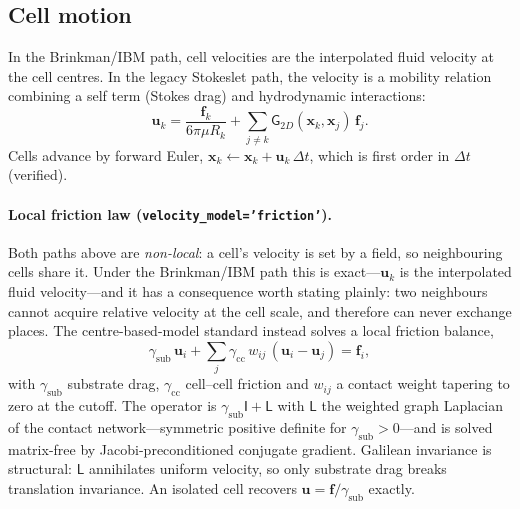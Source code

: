 \documentclass[11pt]{article}
\newcommand{\vu}{\bm{u}}
\newcommand{\vf}{\bm{f}}
\newcommand{\vx}{\bm{x}}
\newcommand{\dt}{\Delta t}
\begin{document}
\subsection{Cell motion}\label{sec:motion}
In the Brinkman/IBM path, cell velocities are the interpolated fluid velocity at
the cell centres. In the legacy Stokeslet path, the velocity is a mobility
relation combining a self term (Stokes drag) and hydrodynamic interactions:
\begin{equation}
  \vu_k = \frac{\vf_k}{6\pi\mu R_k}
  + \sum_{j\neq k} \mathsf{G}_{2D}(\vx_k,\vx_j)\,\vf_j .
\end{equation}
Cells advance by forward Euler, $\vx_k \leftarrow \vx_k + \vu_k\,\dt$, which is
first order in $\dt$ (verified).

\paragraph{Local friction law (\texttt{velocity\_model='friction'}).} Both paths
above are \emph{non-local}: a cell's velocity is set by a field, so neighbouring
cells share it. Under the Brinkman/IBM path this is exact---$\vu_k$ is the
interpolated fluid velocity---and it has a consequence worth stating plainly:
two neighbours cannot acquire relative velocity at the cell scale, and therefore
can never exchange places. The centre-based-model standard instead solves a local
friction balance,
\begin{equation}
  \gamma_{\text{sub}}\,\vu_i
  + \sum_j \gamma_{\text{cc}}\,w_{ij}\,(\vu_i-\vu_j) = \vf_i ,
\end{equation}
with $\gamma_{\text{sub}}$ substrate drag, $\gamma_{\text{cc}}$ cell--cell
friction and $w_{ij}$ a contact weight tapering to zero at the cutoff. The
operator is $\gamma_{\text{sub}}\mathsf{I}+\mathsf{L}$ with $\mathsf{L}$ the
weighted graph Laplacian of the contact network---symmetric positive definite for
$\gamma_{\text{sub}}>0$---and is solved matrix-free by Jacobi-preconditioned
conjugate gradient. Galilean invariance is structural: $\mathsf{L}$ annihilates
uniform velocity, so only substrate drag breaks translation invariance. An
isolated cell recovers $\vu=\vf/\gamma_{\text{sub}}$ exactly.
\end{document}
